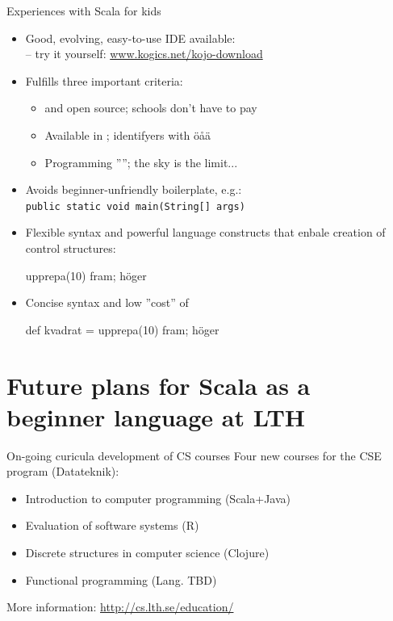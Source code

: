\documentclass{lecturenotes}
\begin{document}
\begin{Slide}{Experiences with Scala for kids}
\begin{itemize}
\item Good, evolving, easy-to-use IDE available: \\  -- try it yourself: 
\href{http://www.kogics.net/kojo}{www.kogics.net/kojo-download}
\item Fulfills three important criteria: 
\begin{itemize}
\item {} and open source; schools don't have to pay
\item Available in ; identifyers with öåä
\item Programming ''''; the sky is the limit...
\end{itemize}
\item Avoids beginner-unfriendly boilerplate, e.g.: \\ \texttt{public static void main(String[] args)}
\item Flexible syntax and powerful language constructs that enbale creation of  control structures:
\begin{Code}
upprepa(10){ fram; höger }
\end{Code}
\item Concise syntax and low ''cost'' of 
\begin{Code}
def kvadrat = upprepa(10){ fram; höger }
\end{Code}
\end{itemize}
\end{Slide}


\section[Plans for Scala at LTH]{Future plans for Scala as a beginner language at LTH}

\begin{Slide}{On-going curicula development of CS courses}
Four new courses for the CSE program (Datateknik):
\begin{itemize}
\item Introduction to computer programming (Scala+Java)
\item Evaluation of software systems (R)
\item Discrete structures in computer science (Clojure)
\item Functional programming (Lang. TBD)
\end{itemize}
\vspace{1em} More information:
\url{http://cs.lth.se/education/}
\end{Slide}
\end{document}

